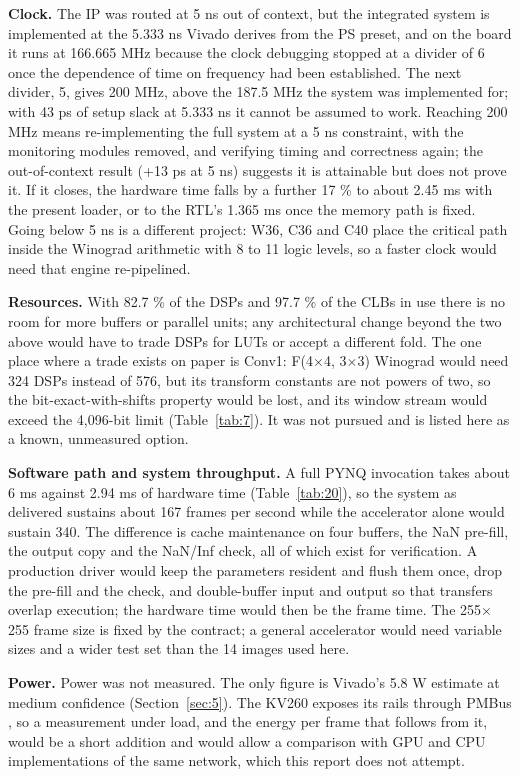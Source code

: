 \textbf{Clock.} The IP was routed at 5 ns out of context, but the integrated system is implemented at the 5.333 ns Vivado derives from the PS preset, and on the board it runs at 166.665 MHz because the clock debugging stopped at a divider of 6 once the dependence of time on frequency had been established. The next divider, 5, gives 200 MHz, above the 187.5 MHz the system was implemented for; with 43 ps of setup slack at 5.333 ns it cannot be assumed to work. Reaching 200 MHz means re-implementing the full system at a 5 ns constraint, with the monitoring modules removed, and verifying timing and correctness again; the out-of-context result (+13 ps at 5 ns) suggests it is attainable but does not prove it. If it closes, the hardware time falls by a further 17 \% to about 2.45 ms with the present loader, or to the RTL's 1.365 ms once the memory path is fixed. Going below 5 ns is a different project: W36, C36 and C40 place the critical path inside the Winograd arithmetic with 8 to 11 logic levels, so a faster clock would need that engine re-pipelined.

\textbf{Resources.} With 82.7 \% of the DSPs and 97.7 \% of the CLBs in use there is no room for more buffers or parallel units; any architectural change beyond the two above would have to trade DSPs for LUTs or accept a different fold. The one place where a trade exists on paper is Conv1: F(4$\times$4, 3$\times$3) Winograd would need 324 DSPs instead of 576, but its transform constants are not powers of two, so the bit-exact-with-shifts property would be lost, and its window stream would exceed the 4,096-bit limit (Table~\ref{tab:7}). It was not pursued and is listed here as a known, unmeasured option.

\textbf{Software path and system throughput.} A full PYNQ invocation takes about 6 ms against 2.94 ms of hardware time (Table~\ref{tab:20}), so the system as delivered sustains about 167 frames per second while the accelerator alone would sustain 340. The difference is cache maintenance on four buffers, the NaN pre-fill, the output copy and the NaN/Inf check, all of which exist for verification. A production driver would keep the parameters resident and flush them once, drop the pre-fill and the check, and double-buffer input and output so that transfers overlap execution; the hardware time would then be the frame time. The 255$\times$255 frame size is fixed by the contract; a general accelerator would need variable sizes and a wider test set than the 14 images used here.

\textbf{Power.} Power was not measured. The only figure is Vivado's 5.8 W estimate at medium confidence (Section~\ref{sec:5}). The KV260 exposes its rails through PMBus \cite{ref11}, so a measurement under load, and the energy per frame that follows from it, would be a short addition and would allow a comparison with GPU and CPU implementations of the same network, which this report does not attempt.

